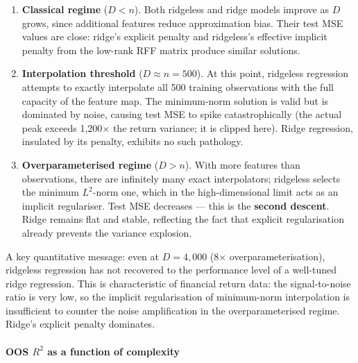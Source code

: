 \begin{enumerate}
\item \textbf{Classical regime} ($D < n$). Both ridgeless and ridge models improve as $D$ grows, since additional features reduce approximation bias. Their test MSE values are close: ridge's explicit penalty and ridgeless's effective implicit penalty from the low-rank RFF matrix produce similar solutions.
\item \textbf{Interpolation threshold} ($D \approx n = 500$). At this point, ridgeless regression attempts to exactly interpolate all 500 training observations with the full capacity of the feature map. The minimum-norm solution is valid but is dominated by noise, causing test MSE to spike catastrophically (the actual peak exceeds 1,200$\times$ the return variance; it is clipped here). Ridge regression, insulated by its penalty, exhibits no such pathology.
\item \textbf{Overparameterised regime} ($D > n$). With more features than observations, there are infinitely many exact interpolators; ridgeless selects the minimum $L^2$-norm one, which in the high-dimensional limit acts as an implicit regulariser. Test MSE decreases --- this is the \textbf{second descent}. Ridge remains flat and stable, reflecting the fact that explicit regularisation already prevents the variance explosion.
\end{enumerate}

A key quantitative message: even at $D = 4{,}000$ (8$\times$ overparameterisation), ridgeless regression has not recovered to the performance level of a well-tuned ridge regression. This is characteristic of financial return data: the signal-to-noise ratio is very low, so the implicit regularisation of minimum-norm interpolation is insufficient to counter the noise amplification in the overparameterised regime. Ridge's explicit penalty dominates.

\paragraph{OOS $R^2$ as a function of complexity}

